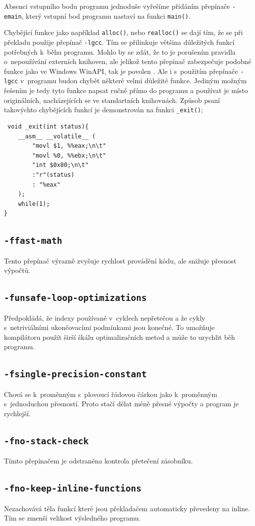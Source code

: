 Absenci vstupního bodu programu jednoduše vyřešíme přidáním přepínače \texttt{-emain}, který vstupní bod programu nastaví na funkci \texttt{main()}.

Chybějící funkce jako například \texttt{alloc()}, nebo \texttt{realloc()} se dají  tím, že se při překladu použije přepínač \texttt{-lgcc}.
Tím se přilinkuje většina důležitých funkcí potřebných k~běhu programu.
Mohlo by se zdát, že to je porušením pravidla o~nepoužívání externích knihoven, ale jelikož tento přepínač zabezpečuje podobné funkce jako ve Windows WinAPI, tak je povolen              .
Ale i s~použitím přepínače \texttt{-lgcc} v~programu budou chybět některé velmi důležité funkce.
Jediným možným řešením je tedy tyto funkce napsat ručně přímo do programu a používat je místo originálních, nacházejících se ve standartních knihovnách.
Způsob psaní takovýchto chybějících funkcí je demonstrován na funkci \texttt{\_exit()};
\begin{lstlisting}
 void _exit(int status){
	__asm__ __volatile__ (
		"movl $1, %%eax;\n\t"
		"movl %0, %%ebx;\n\t"
		"int $0x80;\n\t"
		:"r"(status)
		: "%eax"
	);
	while(1);
}
\end{lstlisting}

\subsection{\texttt{-ffast-math}}
Tento přepínač výrazně zvyšuje rychlost provádění kódu, ale snižuje přesnost výpočtů. 
\subsection{\texttt{-funsafe-loop-optimizations}}
Předpokládá, že indexy používané v~cyklech nepřetečou a že cykly s~netriviálními ukončovacími podmínkami jsou konečné.
To umožňuje kompilátoru použít širší škálu optimalizačních metod a může to urychlit běh programu. 
\subsection{\texttt{-fsingle-precision-constant}}
Chová se k~proměnným s~plovoucí řádovou čárkou jako k~proměnným s~jednoduchou přesností.
Proto stačí dělat méně přesné výpočty a program je rychlejší.
\subsection{\texttt{-fno-stack-check}}
Tímto přepínačem je odstraněna kontrola přetečení zásobníku.
\subsection{\texttt{-fno-keep-inline-functions}}
Nezachovává těla funkcí které jsou překladačem automaticky převedeny na inline.
Tím se zmenší velikost výsledného programu.
